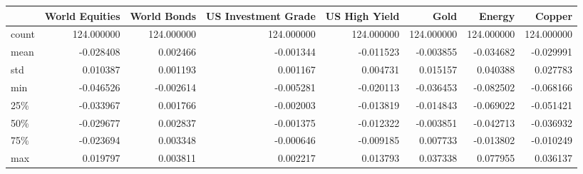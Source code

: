\begin{tabular}{lrrrrrrr}
\toprule
{} &  World Equities &  World Bonds &  US Investment Grade &  US High Yield &        Gold &      Energy &      Copper \\
\midrule
count &      124.000000 &   124.000000 &           124.000000 &     124.000000 &  124.000000 &  124.000000 &  124.000000 \\
mean  &       -0.028408 &     0.002466 &            -0.001344 &      -0.011523 &   -0.003855 &   -0.034682 &   -0.029991 \\
std   &        0.010387 &     0.001193 &             0.001167 &       0.004731 &    0.015157 &    0.040388 &    0.027783 \\
min   &       -0.046526 &    -0.002614 &            -0.005281 &      -0.020113 &   -0.036453 &   -0.082502 &   -0.068166 \\
25\%   &       -0.033967 &     0.001766 &            -0.002003 &      -0.013819 &   -0.014843 &   -0.069022 &   -0.051421 \\
50\%   &       -0.029677 &     0.002837 &            -0.001375 &      -0.012322 &   -0.003851 &   -0.042713 &   -0.036932 \\
75\%   &       -0.023694 &     0.003348 &            -0.000646 &      -0.009185 &    0.007733 &   -0.013802 &   -0.010249 \\
max   &        0.019797 &     0.003811 &             0.002217 &       0.013793 &    0.037338 &    0.077955 &    0.036137 \\
\bottomrule
\end{tabular}
